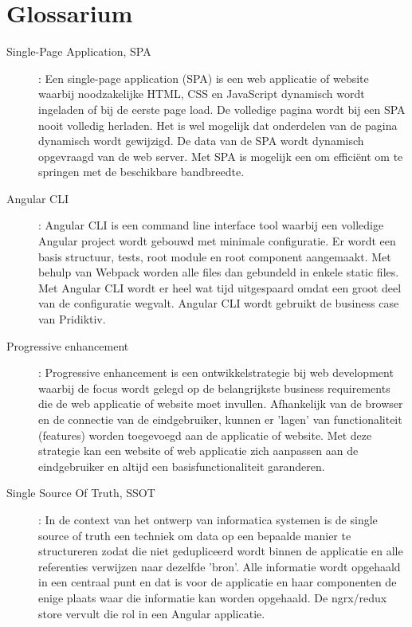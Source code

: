 
\chapter{Glossarium}
\label{ch:glossarium}


\begin{description}
\item[Single-Page Application, SPA]: Een single-page application (SPA) is een web applicatie of website waarbij noodzakelijke HTML, CSS en JavaScript dynamisch wordt ingeladen of bij de eerste page load. De volledige pagina wordt bij een SPA nooit volledig herladen. Het is wel mogelijk dat onderdelen van de pagina dynamisch wordt gewijzigd. De data van de SPA wordt dynamisch opgevraagd van de web server. Met SPA is mogelijk een om effici\"ent om te springen met de beschikbare bandbreedte.
\item[Angular CLI]: Angular CLI is een command line interface tool waarbij een volledige Angular project wordt gebouwd met minimale configuratie. Er wordt een basis structuur, tests, root module en root component aangemaakt. Met behulp van Webpack worden alle files dan gebundeld in enkele static files. Met Angular CLI wordt er heel wat tijd uitgespaard omdat een groot deel van de configuratie wegvalt. Angular CLI wordt gebruikt de business case van Pridiktiv.
\item[Progressive enhancement]: Progressive enhancement is een ontwikkelstrategie bij web development waarbij de focus wordt gelegd op de belangrijkste business requirements die de web applicatie of website moet invullen. Afhankelijk van de browser en de connectie van de eindgebruiker, kunnen er 'lagen' van functionaliteit (features) worden toegevoegd aan de applicatie of website. Met deze strategie kan een website of web applicatie zich aanpassen aan de eindgebruiker en altijd een basisfunctionaliteit garanderen.
\item[Single Source Of Truth, SSOT]: In de context van het ontwerp van informatica systemen is de single source of truth een techniek om data op een bepaalde manier te structureren zodat die niet gedupliceerd wordt binnen de applicatie en alle referenties verwijzen naar dezelfde 'bron'. Alle informatie wordt opgehaald in een centraal punt en dat is voor de applicatie en haar componenten de enige plaats waar die informatie kan worden opgehaald. De ngrx/redux store vervult die rol in een Angular applicatie.

\end{description}

